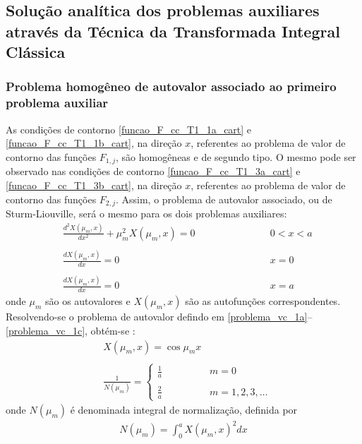 \subsection{Solução analítica dos problemas auxiliares através da Técnica da Transformada Integral Clássica}

\subsubsection{Problema homogêneo de autovalor associado ao primeiro problema auxiliar}

As condições de contorno \eqref{funcao_F_cc_T1_1a_cart} e \eqref{funcao_F_cc_T1_1b_cart}, na direção $x$, referentes ao problema de valor de contorno das funções $F_{1, j}$, são homogêneas e de segundo tipo. O
mesmo pode ser observado nas condições de contorno \eqref{funcao_F_cc_T1_3a_cart} e \eqref{funcao_F_cc_T1_3b_cart}, na direção $x$, referentes ao problema de valor de contorno das funções $F_{2, j}$.
Assim, o problema de autovalor associado, ou de Sturm-Liouville, será o mesmo para os dois problemas auxiliares:
\begin{subequations}
\begin{alignat}{2}
	& \frac{d^2 X(\mu_m, x)}{d x^2} + \mu_m^2 X(\mu_m, x) = 0 \quad\quad\quad\quad\quad\quad && 0 < x < a \label{problema_vc_1a} \\ \nonumber \\
	& \frac{d X(\mu_m, x)}{d x} = 0 && x = 0 \label{problema_vc_1b} \\ \nonumber \\
	& \frac{d X(\mu_m, x)}{d x} = 0 && x = a \label{problema_vc_1c}
\end{alignat}
\end{subequations}
onde $\mu_m$ são os autovalores e $X(\mu_m, x)$ são as autofunções correspondentes. Resolvendo-se o problema de autovalor defindo em \eqref{problema_vc_1a}--\eqref{problema_vc_1c}, obtém-se \citep{livro_ozisik}:
\begin{align}
& X(\mu_m, x) = \cos \mu_m x \\ \nonumber \\
& \frac{1}{N(\mu_m)} = \left\lbrace
	\begin{array}{ll}
		\displaystyle\frac{1}{a} \quad\quad\quad\quad & m = 0 \\ \\
		\displaystyle\frac{2}{a} & m = 1,2,3,\ldots
	\end{array}
\right.
\end{align}
onde $N(\mu_m)$ é denominada integral de normalização, definida por
\begin{align}
N(\mu_m) = \int_0^a X(\mu_m, x)^2 dx
\end{align}

